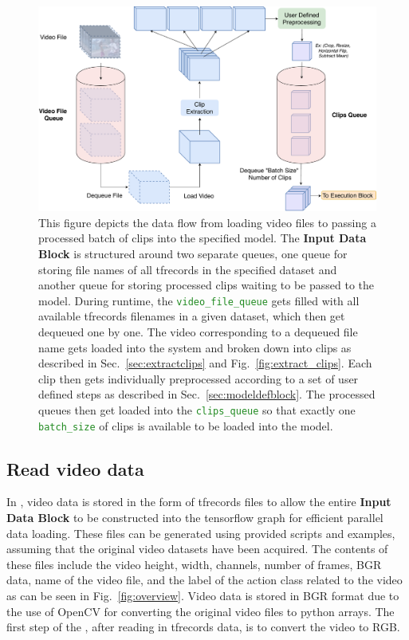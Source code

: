 \documentclass{llncs}
\begin{document}
\begin{figure}[t!]
\centering
\includegraphics[width=1.0\columnwidth]{images/ip_pipeline.pdf}
\caption{This figure depicts the data flow from loading video files to passing a processed batch of clips into the specified model.
The \textbf{Input Data Block} is structured around two separate queues, one queue for storing file names of all tfrecords in the specified dataset and another queue for storing processed clips waiting to be passed to the model.
During runtime, the \texttt{\textcolor{ForestGreen}{video\_file\_queue}} gets filled with all available tfrecords filenames in a given dataset, which then get dequeued one by one.
The video corresponding to a dequeued file name gets loaded into the system and broken down into clips as described in Sec.~\ref{sec:extractclips} and Fig.~\ref{fig:extract_clips}.
Each clip then gets individually preprocessed according to a set of user defined steps as described in Sec.~\ref{sec:modeldefblock}.
The processed queues then get loaded into the \texttt{\textcolor{ForestGreen}{clips\_queue}} so that exactly one \texttt{\textcolor{ForestGreen}{batch\_size}} of clips is available to be loaded into the model.}
\label{fig:ip_block}
\end{figure}


\subsection{Read video data}
\label{sec:readdata}
In \acro, video data is stored in the form of tfrecords files to allow the entire \textbf{Input Data Block} to be constructed into the tensorflow graph for efficient parallel data loading.
These files can be generated using provided scripts and examples, assuming that the original video datasets have been acquired.
The contents of these files include the video height, width, channels, number of frames, BGR data, name of the video file, and the label of the action class related to the video as can be seen in Fig.~\ref{fig:overview}.
Video data is stored in BGR format due to the use of OpenCV for converting the original video files to python arrays.
The first step of the \data, after reading in tfrecords data, is to convert the video to RGB.
\end{document}
